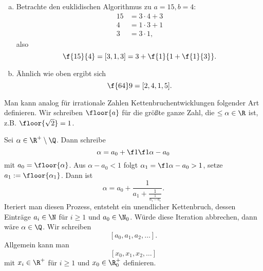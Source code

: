 \begin{ex} \label{6.2}
	\begin{enumerate}[a)]
		\item
			Betrachte den euklidischen Algorithmus zu $a = 15, b = 4$:
			\begin{align*}
				15 &= 3 \cdot 4 + 3 \\
				4 &= 1 \cdot 3 + 1 \\
				3 &= 3 \cdot 1,
			\end{align*}
			also
			\[
				\f {15}{4} = [3, 1, 3] = 3 + \f {1}{1 + \f{1}{3}}.
			\]
		\item
			Ähnlich wie oben ergibt sich
			\[
				\f {64}9 = [2, 4, 1, 5].
			\]
	\end{enumerate}
\end{ex}

\begin{nt} \label{6.3}
	Man kann analog für irrationale Zahlen Kettenbruchentwicklungen folgender Art definieren.
	Wir schreiben $\floor{a}$ für die größte ganze Zahl, die $\le \alpha \in \R$ ist, z.B. $\floor{\sqrt 2} = 1$.

	Sei $\alpha \in \R^+ \setminus \Q$.
	Dann schreibe
	\[
		\alpha = a_0 + \f 1{\f 1{\alpha - a_0}}
	\]
	mit $a_0 = \floor{\alpha}$.
	Aus $\alpha - a_0 < 1$ folgt $\alpha_1 = \f 1{\alpha - a_0} > 1$, setze $a_1 := \floor{\alpha_1}$.
	Dann ist
	\[
		\alpha = a_0 + \dfrac 1{a_1 + \frac 1{\frac 1{\alpha_1 - a_1}}}.
	\]
	Iteriert man diesen Prozess, entsteht ein unendlicher Kettenbruch, dessen Einträge $a_i \in \N$ für $i \ge 1$ und $a_0 \in \N_0$.
	Würde diese Iteration abbrechen, dann wäre $\alpha \in \Q$.
	Wir schreiben
	\[
		[a_0, a_1, a_2, \dotsc].
	\]
	Allgemein kann man
	\[
		[x_0, x_1, x_2, \dotsc]
	\]
	mit $x_i \in \R^+$ für $i \ge 1$ und $x_0 \in \R_0^+$ definieren.
\end{nt}

